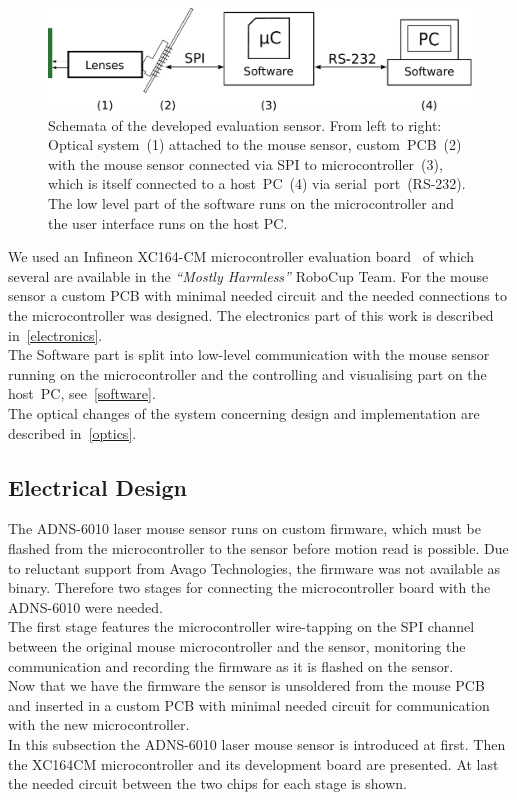 \documentclass[12pt,a4paper]{article}
\newcommand{\MH}{\emph{``Mostly Harmless''} RoboCup Team\xspace}
\begin{document}
\begin{figure}[hb]
\begin{center}
\includegraphics[width=0.9\columnwidth]{figures/block_diagram}
\caption{\label{fig:block-diag-sens}
Schemata of the developed evaluation sensor.
From left to right:
Optical system~(1) attached to the mouse sensor,
custom~PCB~(2) with the mouse sensor connected via SPI to microcontroller~(3), which is itself connected to a host~PC~(4) via serial~port~(RS-232).
The low level part of the software runs on the microcontroller and the user interface runs on the host PC.
}

\end{center}
\end{figure}

We used an Infineon XC164-CM microcontroller evaluation board~\cite{xc} of which several are available in the \MH.
For the mouse sensor a custom PCB with minimal needed circuit and the needed connections to the microcontroller was designed.
The electronics part of this work is described in~\autoref{electronics}.\\
The Software part is split into low-level communication with the mouse sensor running on the microcontroller and the controlling and visualising part on the host~PC, see~\autoref{software}.\\
The optical changes of the system concerning design and implementation are described in~\autoref{optics}.


\subsection{Electrical Design}
\label{electronics}


The ADNS-6010 laser mouse sensor runs on custom firmware, which must be flashed from the microcontroller to the sensor before motion read is possible.
Due to reluctant support from Avago Technologies, the firmware was not available as binary.
Therefore two stages for connecting the microcontroller board with the ADNS-6010 were needed.\\
The first stage features the microcontroller wire-tapping on the SPI channel between the original mouse microcontroller and the sensor, monitoring the communication and recording the firmware as it is flashed on the sensor.\\
Now that we have the firmware the sensor is unsoldered from the mouse PCB and inserted in a custom PCB with minimal needed circuit for communication with the new microcontroller.\\
In this subsection the ADNS-6010 laser mouse sensor is introduced at first.
Then the XC164CM microcontroller and its development board are presented.
At last the needed circuit between the two chips for each stage is shown.
\end{document}
